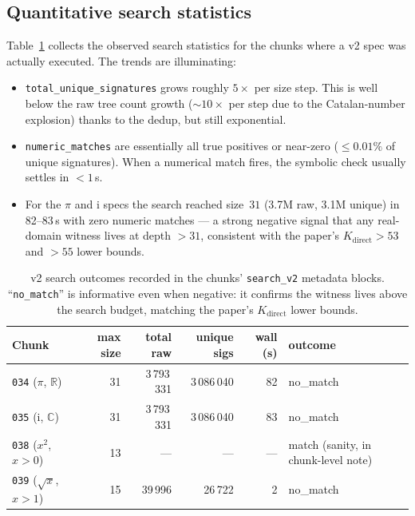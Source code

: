 \documentclass[11pt,a4paper]{article}
\theoremstyle{plain}
\theoremstyle{definition}
\newcommand{\R}{\mathbb{R}}
\newcommand{\C}{\mathbb{C}}
\newcommand{\imu}{\mathrm{i}}
\begin{document}
\subsection{Quantitative search statistics}

Table~\ref{tab:mma-stats} collects the observed search statistics for
the chunks where a v2 spec was actually executed.  The trends are
illuminating:

\begin{itemize}[leftmargin=*,nosep]
\item \texttt{total\_unique\_signatures} grows roughly $5\times$ per
size step.  This is well below the raw tree count growth ($\sim 10\times$
per step due to the Catalan-number explosion) thanks to the dedup, but
still exponential.
\item \texttt{numeric\_matches} are essentially all true positives or
near-zero ($\le 0.01\%$ of unique signatures).  When a numerical match
fires, the symbolic check usually settles in $< 1$\,s.
\item For the $\pi$ and $\imu$ specs the search reached size~$31$
(3.7M raw, 3.1M unique) in 82--83\,s with zero numeric matches --- a
strong negative signal that any real-domain witness lives at depth
$> 31$, consistent with the paper's $K_{\text{direct}}>53$ and
$>55$ lower bounds.
\end{itemize}

\begin{table}[h]
\centering
\small
\begin{tabular}{@{}lrrrrl@{}}
\toprule
\textbf{Chunk} & \textbf{max size} & \textbf{total raw} &
\textbf{unique sigs} & \textbf{wall (s)} & \textbf{outcome}\\
\midrule
\texttt{034} ($\pi$, $\R$)            & 31 & 3\,793\,331 & 3\,086\,040 & 82 & no\_match \\
\texttt{035} ($\imu$, $\C$)           & 31 & 3\,793\,331 & 3\,086\,040 & 83 & no\_match \\
\texttt{038} ($x^2$, $x>0$)           & 13 & ---         & ---         & --- & match (sanity, in chunk-level note)\\
\texttt{039} ($\sqrt{x}$, $x>1$)      & 15 &    39\,996  & 26\,722     &  2 & no\_match \\
\bottomrule
\end{tabular}
\caption{v2 search outcomes recorded in the chunks' \texttt{search\_v2}
metadata blocks.  ``\texttt{no\_match}'' is informative even when
negative: it confirms the witness lives above the search budget,
matching the paper's $K_{\text{direct}}$ lower bounds.}
\label{tab:mma-stats}
\end{table}
\end{document}
